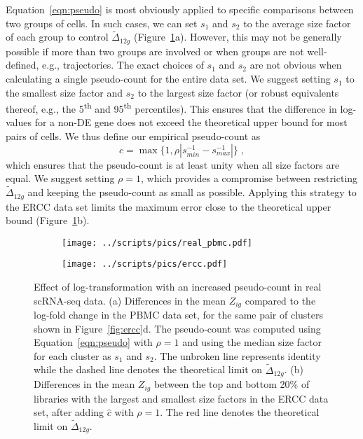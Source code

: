 \documentclass[10pt,letterpaper]{article}
\begin{document}
Equation~\ref{eqn:pseudo} is most obviously applied to specific comparisons between two groups of cells.
In such cases, we can set $s_1$ and $s_2$ to the average size factor of each group to control $\tilde\Delta_{12g}$ (Figure~\ref{fig:bigreal}a).
However, this may not be generally possible if more than two groups are involved or when groups are not well-defined, e.g., trajectories.
The exact choices of $s_1$ and $s_2$ are not obvious when calculating a single pseudo-count for the entire data set.
We suggest setting $s_1$ to the smallest size factor and $s_2$ to the largest size factor
(or robust equivalents thereof, e.g., the 5\textsuperscript{th} and 95\textsuperscript{th} percentiles).
This ensures that the difference in log-values for a non-DE gene does not exceed the theoretical upper bound for most pairs of cells.
We thus define our empirical pseudo-count as
\[
\hat c = \max\{1, \rho |s_{min}^{-1} - s_{max}^{-1}|\} \;,
\]
which ensures that the pseudo-count is at least unity when all size factors are equal.
We suggest setting $\rho=1$, which provides a compromise between restricting $\tilde\Delta_{12g}$ and keeping the pseudo-count as small as possible.
Applying this strategy to the ERCC data set limits the maximum error close to the theoretical upper bound (Figure~\ref{fig:bigreal}b).

\begin{figure}[btp]
\centering
\begin{subfigure}[b]{0.49\textwidth}
    \texttt{[image: ../scripts/pics/real\_pbmc.pdf]}
    \caption{}
\end{subfigure}
\begin{subfigure}[b]{0.49\textwidth}
    \texttt{[image: ../scripts/pics/ercc.pdf]}
    \caption{}
\end{subfigure}
\caption{Effect of log-transformation with an increased pseudo-count in real scRNA-seq data.
(a) Differences in the mean $Z_{ig}$ compared to the log-fold change in the PBMC data set, for the same pair of clusters shown in Figure~\ref{fig:ercc}d.
The pseudo-count was computed using Equation~\ref{eqn:pseudo} with $\rho=1$ and using the median size factor for each cluster as $s_1$ and $s_2$.
The unbroken line represents identity while the dashed line denotes the theoretical limit on $\tilde \Delta_{12g}$.
(b) Differences in the mean $Z_{ig}$ between the top and bottom 20\% of libraries with the largest and smallest size factors in the ERCC data set, after adding $\hat c$ with $\rho =1$.
The red line denotes the theoretical limit on $\tilde \Delta_{12g}$.
}
\label{fig:bigreal}
\end{figure}
\end{document}
